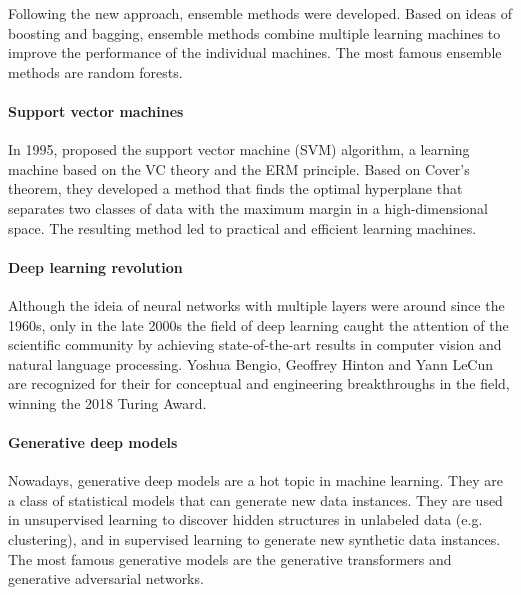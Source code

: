 Following the new approach, ensemble methods were developed.  Based on ideas of
boosting and bagging, ensemble
methods combine multiple learning machines to improve the performance of the individual
machines.  The most famous ensemble methods are random forests.

\paragraph{Support vector machines}

In 1995, \citeauthor{Cortes1995} proposed the support vector machine (SVM) algorithm, a
learning machine based on the VC theory and the ERM principle.  Based on Cover's
theorem, they developed a method that finds the optimal hyperplane
that separates two classes of data with the maximum margin in a high-dimensional space.
The resulting method led to practical and efficient learning machines.

\paragraph{Deep learning revolution}

Although the ideia of neural networks with multiple layers were around since the 1960s,
only in the late 2000s the field of deep learning caught the attention of the scientific
community by achieving state-of-the-art results in computer vision and natural language
processing.  Yoshua Bengio, Geoffrey
Hinton and Yann LeCun are recognized for their for conceptual and engineering
breakthroughs in the field, winning the 2018 Turing Award.

%

\paragraph{Generative deep models}

Nowadays, generative deep models are a hot topic in machine learning. They are a class of
statistical models that can generate new data instances. They are used in unsupervised
learning to discover hidden structures in unlabeled data (e.g. clustering), and in
supervised learning to generate new synthetic data instances.  The most famous generative
models are the generative transformers and generative adversarial networks.

